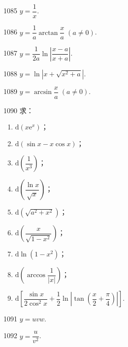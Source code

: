 
\begin{prob}[S]{1085}
$y = \dfrac{1}{x}$.
\end{prob}

\begin{prob}[S]{1086}
$y = \dfrac{1}{a}\arctan \dfrac{x}{a} \; (a \neq 0)$.
\end{prob}

\begin{prob}[S]{1087}
$y = \dfrac{1}{2a}\ln\left|\dfrac{x - a}{x + a}\right|$.
\end{prob}

\begin{prob}[S]{1088}
$y = \ln\left|x + \sqrt{x^2 + a}\right|$.
\end{prob}

\begin{prob}[S]{1089}
$y = \arcsin \dfrac{x}{a} \; (a \neq 0)$.
\end{prob}

\begin{prob}[L]{1090}
求：
\begin{enumerate}[label=(\alph*), itemsep=2pt, topsep=3pt]
\item $\mathrm{d}(x\mathrm{e}^x)$；
\item $\mathrm{d}(\sin x - x\cos x)$；
\item $\mathrm{d}\left(\dfrac{1}{x^3}\right)$；
\item $\mathrm{d}\left(\dfrac{\ln x}{\sqrt{x}}\right)$；
\item $\mathrm{d}(\sqrt{a^2 + x^2})$；
\item $\mathrm{d}\left(\dfrac{x}{\sqrt{1 - x^2}}\right)$；
\item $\mathrm{d}\ln(1 - x^2)$；
\item $\mathrm{d}\left(\arccos \dfrac{1}{|x|}\right)$；
\item $\mathrm{d}\left[\dfrac{\sin x}{2\cos^2 x} + \dfrac{1}{2}\ln\left|\tan\left(\dfrac{x}{2} + \dfrac{\pi}{4}\right)\right|\right]$.
\end{enumerate}
\end{prob}


\begin{prob}[S]{1091}
$y = uvw$.
\end{prob}

\begin{prob}[S]{1092}
$y = \dfrac{u}{v^2}$.
\end{prob}

